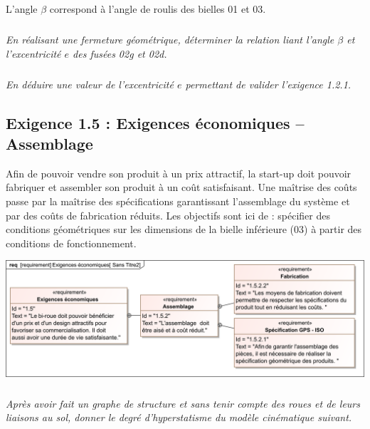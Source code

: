 \documentclass[10pt,fleqn]{article} %
\begin{document}
\begin{multicols}{2}
L’angle $\beta$  correspond à l’angle de roulis des bielles 01 et 03.

\subparagraph{}
\textit{En réalisant une fermeture géométrique, déterminer la relation liant l’angle $\beta$  et l’excentricité $e$ des fusées 02g et 02d.}

\subparagraph{}
\textit{En déduire une valeur de l’excentricité $e$ permettant de valider l’exigence 1.2.1.}

\ifprof
\begin{corrige}
\end{corrige}\else\fi

\newpage

\subsection*{Exigence 1.5 : Exigences économiques -- Assemblage}
\begin{obj}
Afin de pouvoir vendre son produit à un prix attractif, la start-up doit pouvoir fabriquer et assembler son produit à un coût satisfaisant. Une maîtrise des coûts passe par la maîtrise des spécifications garantissant l’assemblage du système et par des coûts de fabrication réduits. Les objectifs sont ici de : spécifier des conditions géométriques sur les dimensions de la bielle inférieure (03) à partir des conditions de fonctionnement.
\end{obj}

\begin{center}
\includegraphics[width=\linewidth]{images/req_02.png}
\end{center}

\subparagraph{}
\textit{Après avoir fait un graphe de structure et sans tenir compte des roues et de leurs liaisons au sol, donner le degré d’hyperstatisme du modèle cinématique suivant.}

\ifprof
\begin{corrige}
\end{corrige}\else\fi


\end{multicols}
\end{document}
